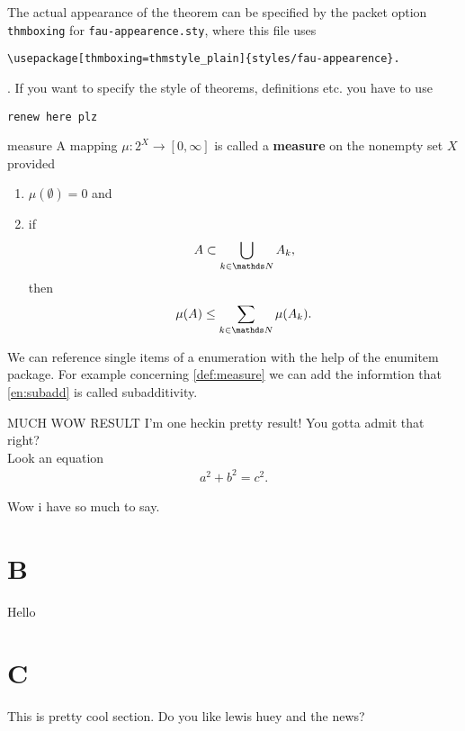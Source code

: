 The actual appearance of the theorem can be specified by the packet option \texttt{thmboxing} 
for \texttt{fau-appearence.sty}, where this file uses
\begin{lstlisting}[language={[LaTeX]TeX}]
\usepackage[thmboxing=thmstyle_plain]{styles/fau-appearence}.
\end{lstlisting} 
.
If you want to specify the style of theorems, definitions etc. you have to use
\begin{lstlisting}[language={[LaTeX]TeX}]
renew here plz
\end{lstlisting}

\begin{definition}{}{measure}
A mapping $\mu:2^{X}\rightarrow[0,\infty]$ is called a {\bfseries measure} on the nonempty
set $X$ provided
\begin{enumerate}[roman, ref=\thetcbcounter (\roman*)]
\item $\mu(\emptyset) = 0$ and
\item \label{en:subadd} if
\begin{align*}
A\subset \bigcup_{k\in\N}A_k,
\end{align*}
then
\begin{align*}
\mu(A)\leq \sum_{k\in\N}\mu(A_k).
\end{align*}
\end{enumerate}
\end{definition}
We can reference single items of a enumeration with the help of the enumitem package. 
For example concerning \cref{def:measure} we can add the informtion that \cref{en:subadd} is 
called subadditivity.
\begin{theorem}{MUCH WOW RESULT}{}
I'm one heckin pretty result! You gotta admit that right?\\
Look an equation
\begin{align*}
a^2+b^2=c^2.
\end{align*}
\end{theorem}

Wow i have so much to say.\newpage

\section{B}
Hello
\section{C}
This is pretty cool section.\newpage
Do you like lewis huey and the news?
